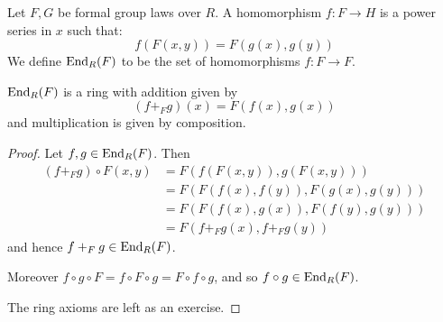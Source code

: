 \documentclass[10pt,a4paper]{article}
\begin{document}
\begin{definition}
  Let $F, G$ be formal group laws over $R$. A homomorphism $f:F\to H$ is a power series in $x$ such that:
  \[f(F(x,y)) = F(g(x), g(y))\]
  We define $\operatorname{End}_R(F)$ to be the set of homomorphisms $f:F\to F$.
\end{definition}
\begin{lemma}
  $\operatorname{End}_R(F)$ is a ring with addition given by
  \[(f +_F g)(x) = F(f(x), g(x))\]
  and multiplication is given by composition.
\end{lemma}
\begin{proof}
  Let $f, g \in \operatorname{End}_R(F)$. Then
  \begin{align*}
    (f+_F g)\circ F(x,y) &= F(f(F(x,y)), g(F(x,y)))\\
    &= F(F(f(x), f(y)), F(g(x), g(y)))\\
    &= F(F(f(x), g(x)),F(f(y),g(y)))\\
    &= F(f+_F g(x), f+_F g(y))
  \end{align*}
  and hence $f+_F g \in \operatorname{End}_R(F)$.

  Moreover $f \circ g \circ F = f \circ F \circ g = F \circ f \circ g$, and so $f \circ g \in \operatorname{End}_R(F)$.

  The ring axioms are left as an exercise.
\end{proof}
\end{document}
